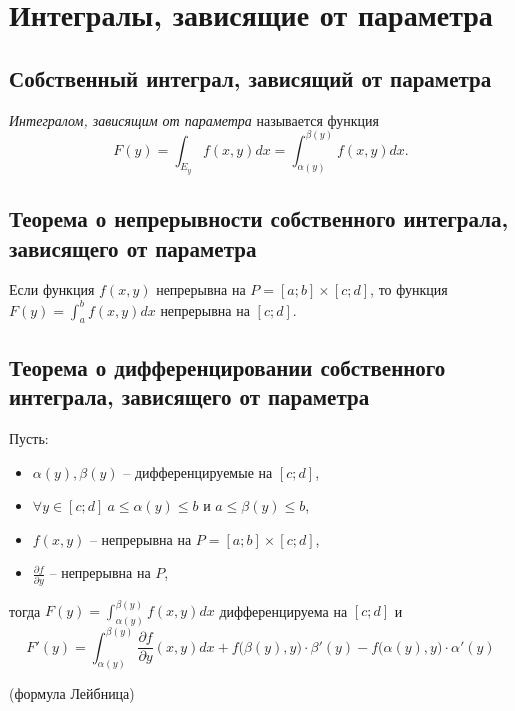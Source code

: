 \section{Интегралы, зависящие от параметра}

\setcounter{subsection}{103}

\subsection{Собственный интеграл, зависящий от параметра}

\begin{definition}
    \emph{Интегралом, зависящим от параметра} называется функция
    \[
        F(y) = \int_{E_y}f(x,y)dx = \int_{\alpha(y)}^{\beta(y)}f(x,y)dx.
    \]
\end{definition}

\subsection{Теорема о непрерывности собственного интеграла, зависящего от параметра}

\begin{theorem}\label{theorem:7.1.1}
    Если функция $f(x,y)$ непрерывна на $P = [a;b] \times [c;d]$, то функция $F(y) = \int_{a}^{b}f(x,y)dx$ непрерывна на $[c;d]$.
\end{theorem}

\subsection{Теорема о дифференцировании собственного интеграла, зависящего от параметра}

\begin{theorem}\label{theorem:7.1.2}
    Пусть:
    \begin{itemize}
        \item $\alpha(y), \beta(y)$ -- дифференцируемые на $[c;d]$,
        \item $\forall y \in [c;d] \ a\leqslant \alpha(y) \leqslant b$ и $a \leqslant \beta(y) \leqslant b$,
        \item $f(x,y)$ -- непрерывна на $P = [a;b] \times [c;d]$,
        \item $\frac{\partial f}{\partial y}$ -- непрерывна на $P$,
    \end{itemize}
    тогда $F(y) = \int_{\alpha(y)}^{\beta(y)}f(x,y)dx$ дифференцируема на $[c;d]$ и
    \[
        F'(y) = \int_{\alpha(y)}^{\beta(y)}\frac{\partial f}{\partial y}(x,y)dx + f\big(\beta(y),y\big) \cdot \beta'(y) - f\big(\alpha(y),y\big)\cdot \alpha'(y)
    \]
    \begin{center}
        (формула Лейбница)
    \end{center}
\end{theorem}

